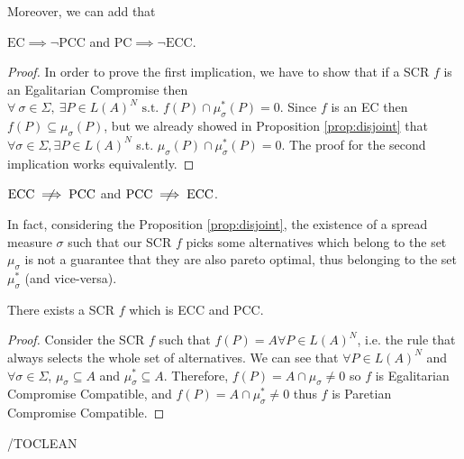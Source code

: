\documentclass[version=3.21, pagesize, notitlepage, twoside=off, bibliography=totoc, DIV=calc, fontsize=12pt, a4paper]{scrartcl}
\newcommand{\musigma}{\mu_{\sigma}}
\newcommand{\mustar}{\mu_{\sigma}^*}
\begin{document}
Moreover, we can add that
\begin{proposition}
	$\text{EC} \implies \lnot \text{PCC}$ and $\text{PC} \implies \lnot \text{ECC}$.
\end{proposition}
\begin{proof}
	In order to prove the first implication, we have to show that if a SCR $f$ is an Egalitarian Compromise then $\forall \ \sigma \in \Sigma , \ \exists P \in L(A)^N  \text{ s.t. }f(P) \cap \mustar(P) = 0$. Since $f$ is an EC then $f(P) \subseteq \musigma(P)$, but we already showed in Proposition \ref{prop:disjoint} that $\forall \sigma \in \Sigma, \exists P \in L(A)^N $ s.t. $\musigma(P)\cap\mustar(P)=0$. The proof for the second implication works equivalently.
\end{proof}


\begin{proposition}
	$\text{ECC} \centernot \implies \text{PCC}$ and $\text{PCC} \centernot \implies \text{ECC}$.
\end{proposition}
 In fact, considering the Proposition \ref{prop:disjoint}, the existence of a spread measure $\sigma$ such that our SCR $f$ picks some alternatives which belong to the set $\musigma$ is not a guarantee that they are also pareto optimal, thus belonging to the set $\mustar$ (and vice-versa).


\begin{proposition}
	There exists a SCR $f$ which is ECC and PCC.
\end{proposition}
\begin{proof}
	Consider the SCR $f$ such that $f(P)=A \forall P \in L(A)^N$, i.e. the rule that always selects the whole set of alternatives. We can see that $\forall P \in L(A)^N$ and $\forall \sigma \in \Sigma$, $\musigma \subseteq A$ and $\mustar \subseteq A$. Therefore, $f(P)=A \cap \musigma \neq 0$ so $f$ is Egalitarian Compromise Compatible, and $f(P)=A \cap \mustar \neq 0$ thus $f$ is Paretian Compromise Compatible.
\end{proof}

/TOCLEAN
\end{document}
